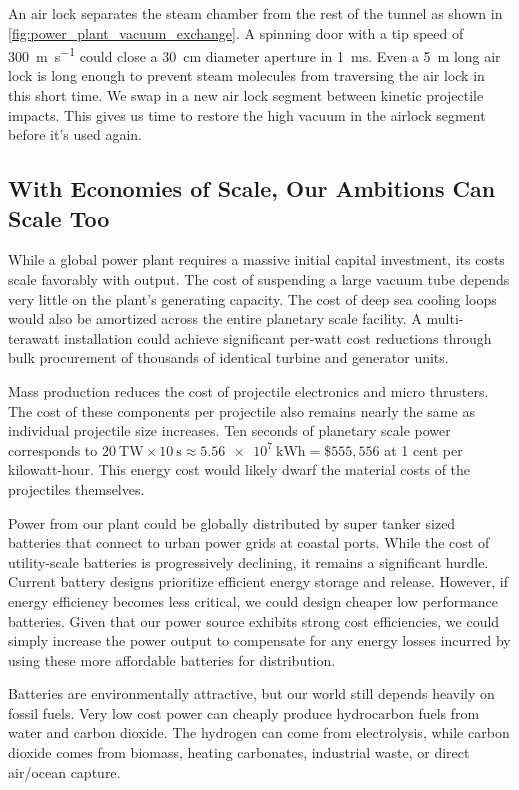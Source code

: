 \documentclass{article}
\begin{document}
An air lock separates the steam chamber from the rest of the tunnel as shown in \autoref{fig:power_plant_vacuum_exchange}.   A spinning door with a tip speed of \SI{300}{\meter\per\second} could close a \SI{30}{\centi\meter} diameter aperture in \SI{1}{\milli\second}.  Even a \SI{5}{\meter} long air lock is long enough to prevent steam molecules from traversing the air lock in this short time.   We swap in a new air lock segment between kinetic projectile impacts.  This gives us time to restore the high vacuum in the airlock segment before it's used again.   


\subsection{With Economies of Scale, Our Ambitions Can Scale Too}\label{sec:strawway_economics}

While a global power plant requires a massive initial capital investment, its costs scale favorably with output. The cost of suspending a large vacuum tube depends very little on the plant's generating capacity. The cost of deep sea cooling loops would also be amortized across the entire planetary scale facility.  A multi-terawatt installation could achieve significant per-watt cost reductions through bulk procurement of thousands of identical turbine and generator units. 

Mass production reduces the cost of projectile electronics and micro thrusters. The cost of these components per projectile also remains nearly the same as individual projectile size increases.  Ten seconds of planetary scale power corresponds to $\SI{20}{\tera\watt} \times \SI{10}{\second} \approx \SI{5.56e7}{\kilo\watt\hour} = \$555,556$ at 1 cent per kilowatt-hour.  This energy cost would likely dwarf the material costs of the projectiles themselves.      

Power from our plant could be globally distributed by super tanker sized batteries that connect to urban power grids at coastal ports.  While the cost of utility-scale batteries is progressively declining, it remains a significant hurdle. Current battery designs prioritize efficient energy storage and release. However, if energy efficiency becomes less critical, we could design cheaper low performance batteries. Given that our power source exhibits strong cost efficiencies, we could simply increase the power output to compensate for any energy losses incurred by using these more affordable batteries for distribution. 

Batteries are environmentally attractive, but our world still depends heavily on fossil fuels.  Very low cost power can cheaply produce hydrocarbon fuels from water and carbon dioxide.  The hydrogen can come from electrolysis, while carbon dioxide comes from biomass, heating carbonates, industrial waste, or direct air/ocean capture.
\end{document}
